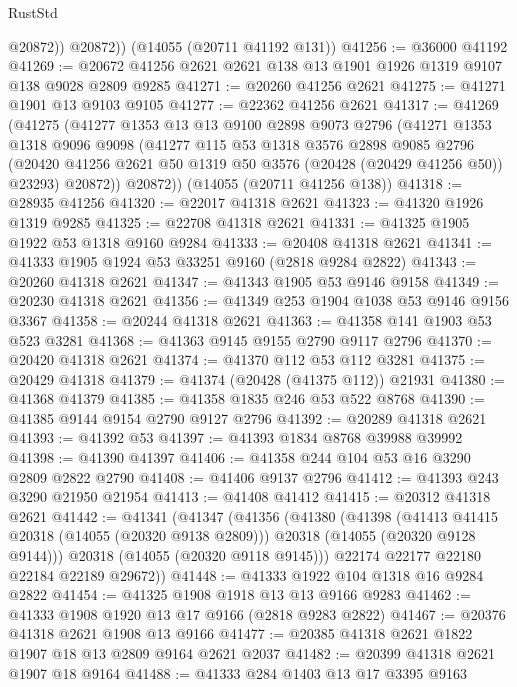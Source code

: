 \begin{lexlean}{RustStd}
\begin{coremodule}
            @20872))
        @20872))
    (@14055 (@20711 @41192 @131))
@41256 := @36000 @41192
@41269 := @20672 @41256 @2621 @2621 @138 @13 @1901 @1926 @1319 @9107 @138 @9028 @2809 @9285
@41271 := @20260 @41256 @2621
@41275 := @41271 @1901 @13 @9103 @9105
@41277 := @22362 @41256 @2621
@41317 := @41269
    (@41275
      (@41277
        @1353
        @13
        @13
        @9100
        @2898
        @9073
        @2796
        (@41271
          @1353
          @1318
          @9096
          @9098
          (@41277
            @115
            @53
            @1318
            @3576
            @2898
            @9085
            @2796
            (@20420 @41256 @2621 @50 @1319 @50 @3576 (@20428 (@20429 @41256 @50)) @23293)
            @20872))
        @20872))
    (@14055 (@20711 @41256 @138))
@41318 := @28935 @41256
@41320 := @22017 @41318 @2621
@41323 := @41320 @1926 @1319 @9285
@41325 := @22708 @41318 @2621
@41331 := @41325 @1905 @1922 @53 @1318 @9160 @9284
@41333 := @20408 @41318 @2621
@41341 := @41333 @1905 @1924 @53 @33251 @9160 (@2818 @9284 @2822)
@41343 := @20260 @41318 @2621
@41347 := @41343 @1905 @53 @9146 @9158
@41349 := @20230 @41318 @2621
@41356 := @41349 @253 @1904 @1038 @53 @9146 @9156 @3367
@41358 := @20244 @41318 @2621
@41363 := @41358 @141 @1903 @53 @523 @3281
@41368 := @41363 @9145 @9155 @2790 @9117 @2796
@41370 := @20420 @41318 @2621
@41374 := @41370 @112 @53 @112 @3281
@41375 := @20429 @41318
@41379 := @41374 (@20428 (@41375 @112)) @21931
@41380 := @41368 @41379
@41385 := @41358 @1835 @246 @53 @522 @8768
@41390 := @41385 @9144 @9154 @2790 @9127 @2796
@41392 := @20289 @41318 @2621
@41393 := @41392 @53
@41397 := @41393 @1834 @8768 @39988 @39992
@41398 := @41390 @41397
@41406 := @41358 @244 @104 @53 @16 @3290 @2809 @2822 @2790
@41408 := @41406 @9137 @2796
@41412 := @41393 @243 @3290 @21950 @21954
@41413 := @41408 @41412
@41415 := @20312 @41318 @2621
@41442 := @41341
    (@41347
      (@41356
        (@41380
          (@41398
            (@41413 @41415 @20318 (@14055 (@20320 @9138 @2809)))
            @20318
            (@14055 (@20320 @9128 @9144)))
          @20318
          (@14055 (@20320 @9118 @9145)))
        @22174
        @22177
        @22180
        @22184
        @22189
        @29672))
@41448 := @41333 @1922 @104 @1318 @16 @9284 @2822
@41454 := @41325 @1908 @1918 @13 @13 @9166 @9283
@41462 := @41333 @1908 @1920 @13 @17 @9166 (@2818 @9283 @2822)
@41467 := @20376 @41318 @2621 @1908 @13 @9166
@41477 := @20385 @41318 @2621 @1822 @1907 @18 @13 @2809 @9164 @2621 @2037
@41482 := @20399 @41318 @2621 @1907 @18 @9164
@41488 := @41333 @284 @1403 @13 @17 @3395 @9163

\end{coremodule}
\end{lexlean}

